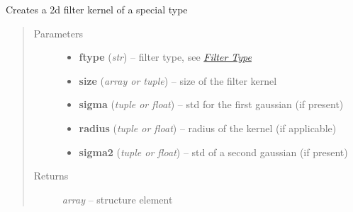 \documentclass[letterpaper,10pt,english]{sphinxmanual}
\begin{document}
\begin{fulllineitems}
\label{api/ClearMap.ImageProcessing.Filter:ClearMap.ImageProcessing.Filter.FilterKernel.filterKernel2D}
Creates a 2d filter kernel of a special type
\begin{quote}\begin{description}
\item[{Parameters}] \leavevmode\begin{itemize}
\item {} 
\textbf{ftype} (\emph{str}) --
filter type, see {\hyperref[api/ClearMap.ImageProcessing.Filter:filtertypes]{\emph{Filter Type}}}

\item {} 
\textbf{size} (\emph{array or tuple}) --
size of the filter kernel

\item {} 
\textbf{sigma} (\emph{tuple or float}) --
std for the first gaussian (if present)

\item {} 
\textbf{radius} (\emph{tuple or float}) --
radius of the kernel (if applicable)

\item {} 
\textbf{sigma2} (\emph{tuple or float}) --
std of a second gaussian (if present)

\end{itemize}

\item[{Returns}] \leavevmode
\emph{array} --
structure element

\end{description}\end{quote}

\end{fulllineitems}

\end{document}
